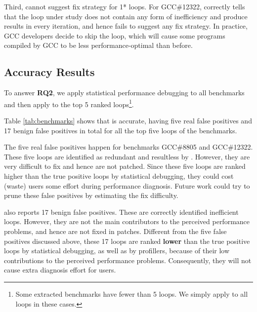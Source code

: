 Third, \Tool cannot suggest fix strategy for 1* loops.
For GCC\#12322, \Tool correctly tells that the loop under study
does not contain any form of inefficiency and produce results in every 
iteration, and hence fails to suggest any fix strategy. In practice, GCC
developers decide to skip the loop, which will cause some programs compiled by
GCC
to be less performance-optimal than before. 

\subsection{Accuracy Results}
\label{sec:result_acc}

%
{\color{red}
To answer \textbf{RQ2}, we apply
statistical performance debugging \cite{SongOOPSLA2014} to all benchmarks
and then apply \Tool to the top 5 ranked loops\footnote{Some extracted benchmarks
have fewer than 5 loops. We simply apply \Tool to all loops in these cases.}.
}
{\color{red}
Table \ref{tab:benchmarks} shows that \Tool is accurate, having five real
false positives and 17 benign false positives in total for all the top five loops
of the \allbugs benchmarks.


The five real false positives happen for benchmarks GCC\#8805 and GCC\#12322.
These five loops are identified as
redundant and resultless by \Tool. However, they
are very difficult to fix and hence are not patched.
Since these five loops are ranked higher than the true positive loops by
statistical debugging, they could cost (waste) \Tool users some effort during 
performance diagnosis. Future work could try to prune these false positives
by estimating the fix difficulty.

\Tool also reports 17 benign false positives. These are 
correctly identified inefficient loops.
However, they are not the main contributors to the perceived
performance problems, and hence are not
fixed in patches. 
Different from the five false positives discussed above, these 17 loops are
ranked {\bf lower} than the true positive loops by statistical debugging, as
well as by profillers,
because of their low contributions to the perceived performance problems.
Consequently, they will not cause extra diagnosis effort for \Tool users.
}


